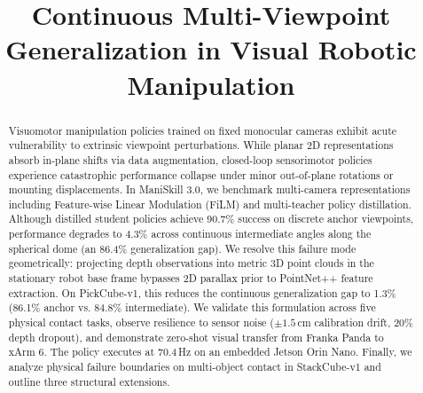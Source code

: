 \documentclass[conference]{IEEEtran}
\begin{document}
\title{Continuous Multi-Viewpoint Generalization in Visual Robotic Manipulation}

\author{
\and
{}
}

\maketitle

\begin{abstract}
Visuomotor manipulation policies trained on fixed monocular cameras exhibit acute vulnerability to extrinsic viewpoint perturbations. While planar 2D representations absorb in-plane shifts via data augmentation, closed-loop sensorimotor policies experience catastrophic performance collapse under minor out-of-plane rotations or mounting displacements. In ManiSkill 3.0, we benchmark multi-camera representations including Feature-wise Linear Modulation (FiLM) and multi-teacher policy distillation. Although distilled student policies achieve 90.7\% success on discrete anchor viewpoints, performance degrades to 4.3\% across continuous intermediate angles along the spherical dome (an 86.4\% generalization gap). We resolve this failure mode geometrically: projecting depth observations into metric 3D point clouds in the stationary robot base frame bypasses 2D parallax prior to PointNet++ feature extraction. On PickCube-v1, this reduces the continuous generalization gap to 1.3\% (86.1\% anchor vs. 84.8\% intermediate). We validate this formulation across five physical contact tasks, observe resilience to sensor noise ($\pm 1.5$\,cm calibration drift, 20\% depth dropout), and demonstrate zero-shot visual transfer from Franka Panda to xArm 6. The policy executes at 70.4\,Hz on an embedded Jetson Orin Nano. Finally, we analyze physical failure boundaries on multi-object contact in StackCube-v1 and outline three structural extensions.
\end{abstract}
\end{document}
